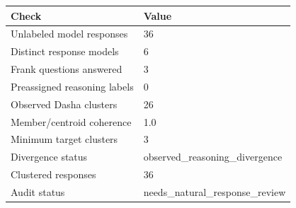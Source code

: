 \begin{tabular}{ll}
\toprule
Check & Value \\
\midrule
Unlabeled model responses & 36 \\
Distinct response models & 6 \\
Frank questions answered & 3 \\
Preassigned reasoning labels & 0 \\
Observed Dasha clusters & 26 \\
Member/centroid coherence & 1.0 \\
Minimum target clusters & 3 \\
Divergence status & observed\_reasoning\_divergence \\
Clustered responses & 36 \\
Audit status & needs\_natural\_response\_review \\
\bottomrule
\end{tabular}
